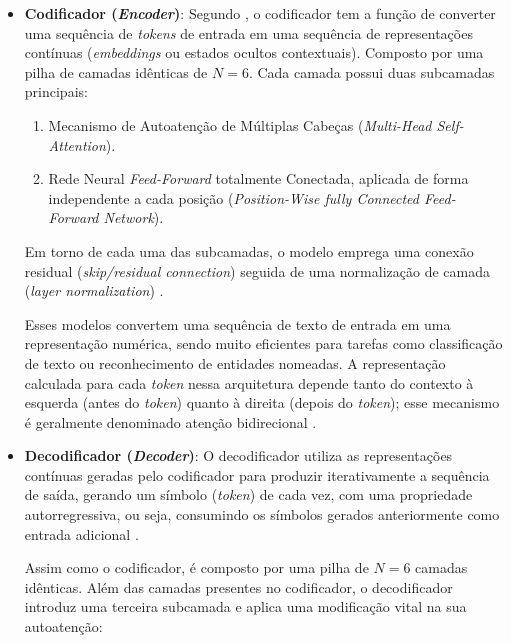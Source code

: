 \documentclass[
    12pt,                %
    openright,           %
    oneside,             %
    a4paper,             %
    english,             %
    brazil               %
]{abntex2}
\begin{document}
\begin{itemize}
  \item \textbf{Codificador (\textit{Encoder})}: 
Segundo , o codificador tem a função de converter uma sequência de \textit{tokens} de entrada em uma sequência de representações contínuas (\textit{embeddings} ou estados ocultos contextuais).
Composto por uma pilha de camadas idênticas de $N = 6$.
Cada camada possui duas subcamadas principais:

\begin{enumerate}
  \item Mecanismo de Autoatenção de Múltiplas Cabeças (\textit{Multi-Head Self-Attention}).
  \item Rede Neural \textit{Feed-Forward} totalmente Conectada, aplicada de forma independente a cada posição (\textit{Position-Wise fully Connected Feed-Forward Network}).
\end{enumerate}

\par
Em torno de cada uma das subcamadas, o modelo emprega uma conexão residual (\textit{skip/residual connection}) seguida de uma normalização de camada (\textit{layer normalization}) \cite{vaswani2017attention, tunstall2022natural}.
\par
Esses modelos convertem uma sequência de texto de entrada em uma representação numérica, sendo muito eficientes para tarefas como classificação de texto ou reconhecimento de entidades nomeadas. A representação calculada para cada \textit{token} nessa arquitetura depende tanto do contexto à esquerda (antes do \textit{token}) quanto à direita (depois do \textit{token}); esse mecanismo é geralmente denominado atenção bidirecional \cite{tunstall2022natural}.
  \item \textbf{Decodificador (\textit{Decoder})}:
O decodificador utiliza as representações contínuas geradas pelo codificador para produzir iterativamente a sequência de saída, gerando um símbolo (\textit{token}) de cada vez, com uma propriedade autorregressiva, ou seja, consumindo os símbolos gerados anteriormente como entrada adicional \cite{vaswani2017attention, tunstall2022natural}.
\par
Assim como o codificador, é composto por uma pilha de $N = 6$ camadas idênticas.
Além das camadas presentes no codificador, o decodificador introduz uma terceira subcamada e aplica uma modificação vital na sua autoatenção:


\end{itemize}
\end{document}
